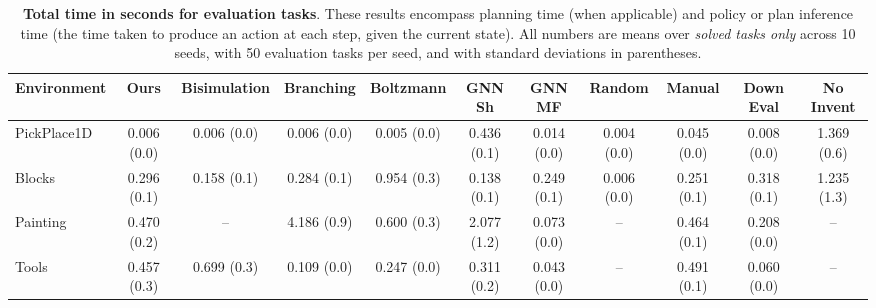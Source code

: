 \begin{table}[t]
	\centering
	\scriptsize
	
	\begin{tabular}{| l | c || c | c | c | c | c | c || c | c | c | }
	\hline
	{\bf{Environment}} &{\bf{Ours}} &
	{\bf{Bisimulation}} &
	{\bf{Branching}} &
	{\bf{Boltzmann}} &
	{\bf{GNN Sh}} &
	{\bf{GNN MF}} &
	{\bf{Random}} &
	{\bf{Manual}} &
	{\bf{Down Eval}} &
	{\bf{No Invent}} \\
	\hline
	PickPlace1D & 0.006 (0.0) & 0.006 (0.0) & 0.006 (0.0) & 0.005 (0.0) & 0.436 (0.1) & 0.014 (0.0) & 0.004 (0.0) & 0.045 (0.0) & 0.008 (0.0) & 1.369 (0.6) \\
	Blocks & 0.296 (0.1) & 0.158 (0.1) & 0.284 (0.1) & 0.954 (0.3) & 0.138 (0.1) & 0.249 (0.1) & 0.006 (0.0) & 0.251 (0.1) & 0.318 (0.1) & 1.235 (1.3) \\
	Painting & 0.470 (0.2) & \;\;\;-- & 4.186 (0.9) & 0.600 (0.3) & 2.077 (1.2) & 0.073 (0.0) & \;\;\;-- & 0.464 (0.1) & 0.208 (0.0) & \;\;\;-- \\
	Tools & 0.457 (0.3) & 0.699 (0.3) & 0.109 (0.0) & 0.247 (0.0) & 0.311 (0.2) & 0.043 (0.0) & \;\;\;-- & 0.491 (0.1) & 0.060 (0.0) & \;\;\;-- \\\hline

	\end{tabular}
	\caption{\textbf{Total time in seconds for evaluation tasks}. These results encompass planning time (when applicable) and policy or plan inference time (the time taken to produce an action at each step, given the current state). All numbers are means over \emph{solved tasks only} across 10 seeds, with 50 evaluation tasks per seed, and with standard deviations in parentheses.}
	\label{tab:alltimeresults}
\end{table}